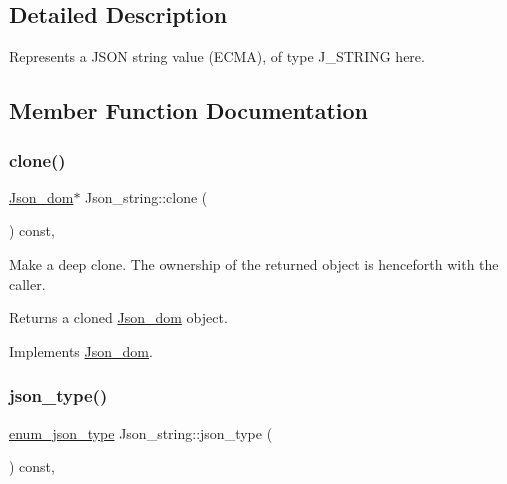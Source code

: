 \subsection{Detailed Description}
Represents a J\+S\+ON string value (E\+C\+MA), of type J\+\_\+\+S\+T\+R\+I\+NG here. 

\subsection{Member Function Documentation}
\mbox{\label{classJson__string_a57fb9e6a51883be719c67d3c6ceb6af9}} 
\subsubsection{\texorpdfstring{clone()}{clone()}}
{\footnotesize\ttfamily \mbox{\hyperlink{classJson__dom}{Json\+\_\+dom}}$\ast$ Json\+\_\+string\+::clone (\begin{DoxyParamCaption}{ }\end{DoxyParamCaption}) const\hspace{0.3cm}{\ttfamily [inline]}, {\ttfamily [virtual]}}

Make a deep clone. The ownership of the returned object is henceforth with the caller.

\begin{DoxyReturn}{Returns}
a cloned \mbox{\hyperlink{classJson__dom}{Json\+\_\+dom}} object. 
\end{DoxyReturn}


Implements \mbox{\hyperlink{classJson__dom_a03c529d590cc4cdb747ccb82f4b70fb5}{Json\+\_\+dom}}.

\mbox{\label{classJson__string_a017004aa85b748d8cb225bd9cd159722}} 
\subsubsection{\texorpdfstring{json\+\_\+type()}{json\_type()}}
{\footnotesize\ttfamily \mbox{\hyperlink{classJson__dom_af37eed7dfe1da1d6507d3ab85320eb03}{enum\+\_\+json\+\_\+type}} Json\+\_\+string\+::json\+\_\+type (\begin{DoxyParamCaption}{ }\end{DoxyParamCaption}) const\hspace{0.3cm}{\ttfamily [inline]}, {\ttfamily [virtual]}}

